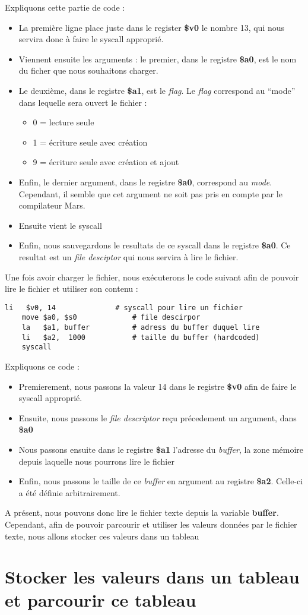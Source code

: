 \documentclass{report}
\begin{document}
Expliquons cette partie de code :
\begin{itemize}
	\item La première ligne place juste dans le register \textbf{\$v0} le nombre 13, qui nous servira donc à faire le syscall approprié.
	\item Viennent ensuite les arguments : le premier, dans le registre \textbf{\$a0}, est le nom du ficher que nous souhaitons charger.
	\item Le deuxième, dans le registre \textbf{\$a1}, est le \textit{flag}. Le \textit{flag} correspond au ``mode'' dans lequelle sera ouvert le fichier :
		\begin{itemize}
			\item 0 = lecture seule
			\item 1 = écriture seule avec création
			\item 9 = écriture seule avec création et ajout
		\end{itemize}  
	\item Enfin, le dernier argument, dans le registre \textbf{\$a0}, correspond au \textit{mode}. Cependant, il semble que cet argument ne soit pas pris en compte par le compilateur Mars.
	\item Ensuite vient le syscall
	\item Enfin, nous sauvegardons le resultats de ce syscall dans le registre \textbf{\$a0}. Ce resultat est un \textit{file desciptor} qui nous servira à lire le fichier. 
\end{itemize}

Une fois avoir charger le fichier, nous exécuterons le code suivant afin de pouvoir lire le fichier et utiliser son contenu :
\begin{lstlisting}[language={[mips]Assembler}]
	li   $v0, 14              # syscall pour lire un fichier
	move $a0, $s0             # file descirpor
	la   $a1, buffer          # adress du buffer duquel lire
	li   $a2,  1000           # taille du buffer (hardcoded)
	syscall 
\end{lstlisting}
Expliquons ce code :
\begin{itemize}
	\item Premierement, nous passons la valeur 14 dans le registre \textbf{\$v0} afin de faire le syscall approprié.
	\item Ensuite, nous passons le \textit{file descriptor} reçu précedement un argument, dans \textbf{\$a0}
	\item Nous passons ensuite dans le registre \textbf{\$a1} l'adresse du \textit{buffer}, la zone mémoire depuis laquelle nous pourrons lire le fichier
	\item Enfin, nous passons le taille de ce \textit{buffer} en argument au registre \textbf{\$a2}. Celle-ci a été définie arbitrairement.
\end{itemize}

A présent, nous pouvons donc lire le fichier texte depuis la variable \textbf{buffer}. Cependant, afin de pouvoir parcourir et utiliser les valeurs données par le fichier texte, nous allons stocker ces valeurs dans un tableau

\chapter{Stocker les valeurs dans un tableau et parcourir ce tableau}
\end{document}
